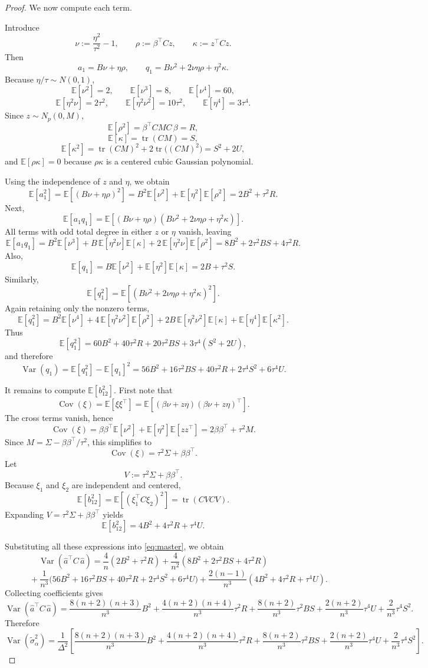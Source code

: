 \documentclass[11pt]{article}
\newcommand{\1}{\mathbf{1}}
\newcommand{\tr}{\operatorname{tr}}
\newcommand{\Var}{\operatorname{Var}}
\newcommand{\Cov}{\operatorname{Cov}}
\newcommand{\E}{\mathbb{E}}
\begin{document}
\begin{proof}
We now compute each term.

\medskip

Introduce
\[
\nu:=\frac{\eta^2}{\tau^2}-1,\qquad
\rho:=\beta^\top Cz,\qquad
\kappa:=z^\top Cz.
\]
Then
\[
a_1=B\nu+\eta\rho,
\qquad
q_1=B\nu^2+2\nu\eta\rho+\eta^2\kappa.
\]
Because \(\eta/\tau\sim N(0,1)\),
\[
\E[\nu^2]=2,\qquad
\E[\nu^3]=8,\qquad
\E[\nu^4]=60,
\]
\[
\E[\eta^2\nu]=2\tau^2,\qquad
\E[\eta^2\nu^2]=10\tau^2,\qquad
\E[\eta^4]=3\tau^4.
\]
Since \(z\sim N_p(0,M)\),
\[
\E[\rho^2]=\beta^\top CMC\,\beta=R,
\]
\[
\E[\kappa]=\tr(CM)=S,
\]
\[
\E[\kappa^2]=\tr(CM)^2+2\tr\!\bigl((CM)^2\bigr)=S^2+2U,
\]
and \(\E[\rho\kappa]=0\) because \(\rho\kappa\) is a centered cubic Gaussian polynomial.

Using the independence of \(z\) and \(\eta\), we obtain
\[
\E[a_1^2]
=
\E[(B\nu+\eta\rho)^2]
=
B^2\E[\nu^2]+\E[\eta^2]\E[\rho^2]
=
2B^2+\tau^2R.
\]
Next,
\[
\E[a_1q_1]
=
\E[(B\nu+\eta\rho)(B\nu^2+2\nu\eta\rho+\eta^2\kappa)].
\]
All terms with odd total degree in either \(z\) or \(\eta\) vanish, leaving
\[
\E[a_1q_1]
=
B^2\E[\nu^3]
+
B\,\E[\eta^2\nu]\E[\kappa]
+
2\,\E[\eta^2\nu]\E[\rho^2]
=
8B^2+2\tau^2BS+4\tau^2R.
\]
Also,
\[
\E[q_1]
=
B\E[\nu^2]+\E[\eta^2]\E[\kappa]
=
2B+\tau^2S.
\]
Similarly,
\[
\E[q_1^2]
=
\E[(B\nu^2+2\nu\eta\rho+\eta^2\kappa)^2].
\]
Again retaining only the nonzero terms,
\[
\E[q_1^2]
=
B^2\E[\nu^4]
+
4\,\E[\eta^2\nu^2]\E[\rho^2]
+
2B\,\E[\eta^2\nu^2]\E[\kappa]
+
\E[\eta^4]\E[\kappa^2].
\]
Thus
\[
\E[q_1^2]
=
60B^2+40\tau^2R+20\tau^2BS+3\tau^4(S^2+2U),
\]
and therefore
\[
\Var(q_1)
=
\E[q_1^2]-\E[q_1]^2
=
56B^2+16\tau^2BS+40\tau^2R+2\tau^4S^2+6\tau^4U.
\]

It remains to compute \(\E[b_{12}^2]\). First note that
\[
\Cov(\xi)
=
\E[\xi\xi^\top]
=
\E\!\left[\left(\beta\nu+z\eta\right)\left(\beta\nu+z\eta\right)^\top\right].
\]
The cross terms vanish, hence
\[
\Cov(\xi)
=
\beta\beta^\top \E[\nu^2]+\E[\eta^2]\E[zz^\top]
=
2\beta\beta^\top+\tau^2M.
\]
Since \(M=\Sigma-\beta\beta^\top/\tau^2\), this simplifies to
\[
\Cov(\xi)=\tau^2\Sigma+\beta\beta^\top.
\]
Let
\[
V:=\tau^2\Sigma+\beta\beta^\top.
\]
Because \(\xi_1\) and \(\xi_2\) are independent and centered,
\[
\E[b_{12}^2]
=
\E[(\xi_1^\top C\xi_2)^2]
=
\tr(CVCV).
\]
Expanding \(V=\tau^2\Sigma+\beta\beta^\top\) yields
\[
\E[b_{12}^2]
=
4B^2+4\tau^2R+\tau^4U.
\]

Substituting all these expressions into \eqref{eq:master}, we obtain
\[
\Var(\widehat a^\top C\,\widehat a)
=
\frac{4}{n}(2B^2+\tau^2R)
+\frac{4}{n^2}(8B^2+2\tau^2BS+4\tau^2R)
\]
\[
\hspace{3em}
+\frac{1}{n^3}\bigl(56B^2+16\tau^2BS+40\tau^2R+2\tau^4S^2+6\tau^4U\bigr)
+\frac{2(n-1)}{n^3}(4B^2+4\tau^2R+\tau^4U).
\]
Collecting coefficients gives
\[
\Var(\widehat a^\top C\,\widehat a)
=
\frac{8(n+2)(n+3)}{n^3}B^2
+\frac{4(n+2)(n+4)}{n^3}\tau^2R
+\frac{8(n+2)}{n^3}\tau^2BS
+\frac{2(n+2)}{n^3}\tau^4U
+\frac{2}{n^3}\tau^4S^2.
\]
Therefore
\[
\Var(\widetilde{\sigma}_\alpha^2)
=
\frac{1}{\Delta^2}
\left[
\frac{8(n+2)(n+3)}{n^3}B^2
+\frac{4(n+2)(n+4)}{n^3}\tau^2R
+\frac{8(n+2)}{n^3}\tau^2BS
+\frac{2(n+2)}{n^3}\tau^4U
+\frac{2}{n^3}\tau^4S^2
\right].
\]


\end{proof}
\end{document}
